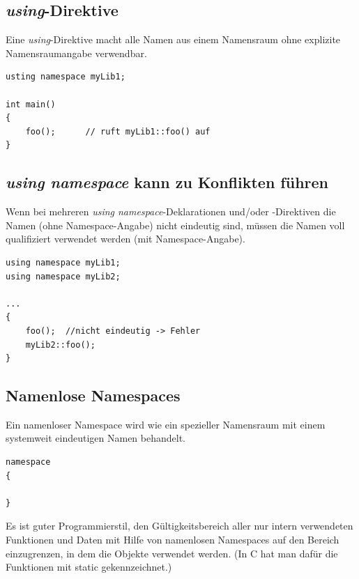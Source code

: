 \subsection{\emph{using}-Direktive}
\begin{minipage}[t]{0.5\linewidth}
	Eine \emph{using}-Direktive macht alle Namen aus einem Namensraum ohne explizite Namensraumangabe verwendbar.
\end{minipage}%
\hspace{0.04\linewidth}
\begin{minipage}[t]{0.45\linewidth}
\vspace{-3\baselineskip}
\begin{lstlisting}
usting namespace myLib1;

int main()
{
	foo();		// ruft myLib1::foo() auf
}
\end{lstlisting}
\end{minipage}

\subsection{\emph{using namespace} kann zu Konflikten führen}
\begin{minipage}[t]{0.5\linewidth}
Wenn bei mehreren \emph{using namespace}-Deklarationen und/oder -Direktiven die Namen (ohne Namespace-Angabe) nicht eindeutig sind, müssen die Namen voll qualifiziert verwendet werden (mit Namespace-Angabe).
\end{minipage}%
\hspace{0.04\linewidth}
\begin{minipage}[t]{0.45\linewidth}
\vspace{-3\baselineskip}
\begin{lstlisting}
using namespace myLib1;
using namespace myLib2;

...
{
	foo();	//nicht eindeutig -> Fehler
	myLib2::foo();
}
\end{lstlisting}
\end{minipage}

\subsection{Namenlose Namespaces}
\begin{minipage}[t]{0.8\linewidth}
Ein namenloser Namespace wird wie ein spezieller Namensraum mit einem systemweit eindeutigen Namen behandelt.
\end{minipage}%
\hspace{0.04\linewidth}
\begin{minipage}[t]{0.15\linewidth}
\vspace{-3\baselineskip}
\begin{lstlisting}
namespace
{

}
\end{lstlisting}
\end{minipage}
\begin{hinweis}
	Es ist guter Programmierstil, den Gültigkeitsbereich aller nur intern verwendeten Funktionen und Daten mit Hilfe von namenlosen Namespaces auf den Bereich einzugrenzen, in dem die Objekte verwendet werden. (In C hat man dafür die Funktionen mit static gekennzeichnet.)
\end{hinweis}


